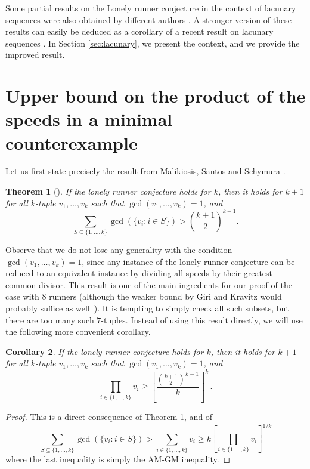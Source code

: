 \documentclass[11pt,a4paper]{article}
\newtheorem{theorem}{Theorem}
\newtheorem{corollary}[theorem]{Corollary}
\theoremstyle{definition}
\theoremstyle{remark}
\begin{document}
Some partial results on the Lonely runner conjecture in the context of lacunary sequences were also obtained by different authors
\cite{BARAJAS20095687,CZERWINSKI20181301,DubickasLacunary,pandey2009note,RUZSA2002181}. A stronger version of these results can easily be deduced as a corollary of a recent result on lacunary sequences \cite{Rosenfeld2025Mar}. In Section \ref{sec:lacunary}, we present the context, and we provide the improved result.



\section{Upper bound on the product of the speeds in a minimal counterexample}
Let us first state precisely the result from Malikiosis, Santos and Schymura \cite{Malikiosis2024Nov}.
\begin{theorem}[{\cite[Theorem A]{Malikiosis2024Nov}}]\label{UpperBoundOnSum}
If the lonely runner conjecture holds for $k$, then it holds for $k+1$ for all $k$-tuple $v_1, \ldots, v_k$ such that $\gcd(v_1, \ldots, v_k)=1$, and
\[
\sum_{S\subseteq \{1,\ldots, k\}} \gcd(\{v_i: i\in S\}) >\binom{k+1}{2}^{k-1}.
\]
\end{theorem}
Observe that we do not lose any generality with the condition $\gcd(v_1, \ldots, v_k)=1$, since any instance of the lonely runner conjecture can be reduced to an equivalent instance by dividing all speeds by their greatest common divisor.
This result is one of the main ingredients for our proof of the case with $8$ runners (although the weaker bound by Giri and Kravitz would probably suffice as well~\cite{Giri2023Apr}). It is tempting to simply check all such subsets, but there are too many such $7$-tuples. Instead of using this result directly, we will use the following more convenient corollary.

\begin{corollary}\label{cor:UpperBoundOnProduct}
If the lonely runner conjecture holds for $k$, then it holds for $k+1$ for all $k$-tuple $v_1, \ldots, v_k$ such that $\gcd(v_1, \ldots, v_k)=1$, and
\[
\prod_{i\in \{1,\ldots, k\}}v_i\ge  \left[\frac{\binom{k+1}{2}^{k-1}}{k}\right]^k\,.
\]
\end{corollary}
\begin{proof}
  This is a direct consequence of Theorem \ref{UpperBoundOnSum}, and of
\[
\sum_{S\subseteq  \{1,\ldots, k\}} \gcd(\{v_i: i\in S\})
>\sum_{i \in \{1,\ldots, k\}} v_i
\ge  k \left[\prod_{i\in \{1,\ldots, k\}}v_i\right]^{1/k}
\]
where the last inequality is simply the AM-GM inequality.
\end{proof}
\end{document}
